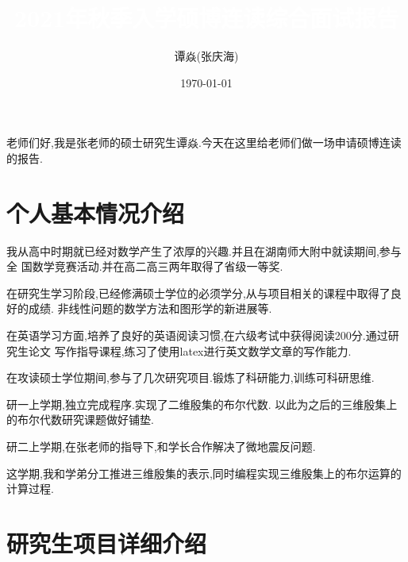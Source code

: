 \documentclass[UTF8]{ctexbeamer}	%
\title{\textcolor{white}{2021年秋季入学硕博连读综合面试报告}}
\author{谭焱(张庆海)}
\institute{浙江大学数学科学学院}
\date{\today}
\theoremstyle{plain}
\theoremstyle{definition}
\newtheorem{emt}{}[section]
\theoremstyle{remark}
\numberwithin{equation}{section}
\begin{document}

    \begin{frame}
        \titlepage
    \end{frame}
\begin{frame}
 老师们好,我是张老师的硕士研究生谭焱.今天在这里给老师们做一场申请硕博连读的报告.
\end{frame}



\section{个人基本情况介绍}


        


\begin{frame}[fragile]
 我从高中时期就已经对数学产生了浓厚的兴趣.并且在湖南师大附中就读期间,参与全
 国数学竞赛活动.并在高二高三两年取得了省级一等奖.

 在研究生学习阶段,已经修满硕士学位的必须学分,从与项目相关的课程中取得了良好的成绩.
 非线性问题的数学方法和图形学的新进展等.

 在英语学习方面,培养了良好的英语阅读习惯,在六级考试中获得阅读200分.通过研究生论文
 写作指导课程,练习了使用latex进行英文数学文章的写作能力.
\end{frame}

\begin{frame}[fragile]
   在攻读硕士学位期间,参与了几次研究项目.锻炼了科研能力,训练可科研思维.

   研一上学期,独立完成程序.实现了二维殷集的布尔代数.
   以此为之后的三维殷集上的布尔代数研究课题做好铺垫.

   研二上学期,在张老师的指导下,和学长合作解决了微地震反问题.

   这学期,我和学弟分工推进三维殷集的表示,同时编程实现三维殷集上的布尔运算的计算过程.
\end{frame}

\section{研究生项目详细介绍}
\end{document}
